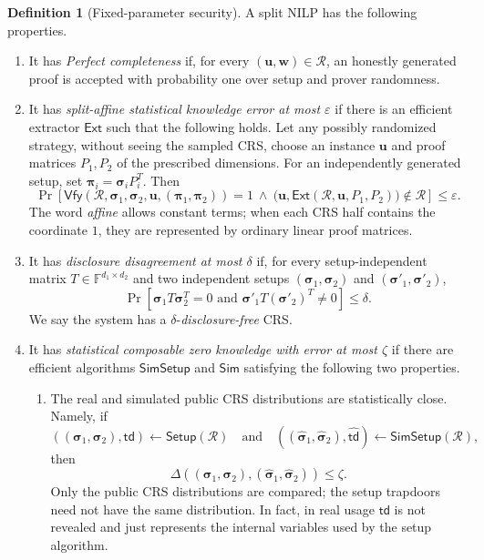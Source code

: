 \documentclass[11pt]{article}
\theoremstyle{definition}
\newtheorem{definition}[theorem]{Definition}
\newcommand{\F}{\mathbb F}
\newcommand{\cR}{\mathcal R}
\newcommand{\Setup}{\mathsf{Setup}}
\newcommand{\SimSetup}{\mathsf{SimSetup}}
\newcommand{\Vfy}{\mathsf{Vfy}}
\newcommand{\Sim}{\mathsf{Sim}}
\newcommand{\Ext}{\mathsf{Ext}}
\newcommand{\td}{\mathsf{td}}
\begin{document}
\begin{definition}[Fixed-parameter security]
\label{def:nilp-security}
A split NILP has the following properties.
\begin{enumerate}
  \item It has \emph{Perfect completeness} if, for every
  $(\mathbf u,\mathbf w)\in\cR$, an honestly generated proof is accepted with
  probability one over setup and prover randomness.

  \item It has \emph{split-affine statistical knowledge error at most
  $\varepsilon$} if there is an efficient extractor $\Ext$ such that the
  following holds.  Let any possibly randomized strategy, without seeing the
  sampled CRS, choose an instance $\mathbf u$ and proof matrices $P_1,P_2$ of
  the prescribed dimensions.  For an independently generated setup, set
  $\boldsymbol{\pi}_i=\boldsymbol{\sigma}_iP_i^T$.  Then
  \[
    \Pr\!\left[
      \Vfy(\cR,\boldsymbol{\sigma}_1,\boldsymbol{\sigma}_2,
           \mathbf u,(\boldsymbol{\pi}_1,\boldsymbol{\pi}_2))=1
      \ \land\
      \bigl(\mathbf u,\Ext(\cR,\mathbf u,P_1,P_2)\bigr)\notin\cR
    \right]
    \le\varepsilon.
  \]
  The word \emph{affine} allows constant terms; when each CRS half contains
  the coordinate $1$, they are represented by ordinary linear proof
  matrices.

  \item It has \emph{disclosure disagreement at most $\delta$} if, for every
  setup-independent matrix $T\in\F^{d_1\times d_2}$ and two independent
  setups $(\boldsymbol{\sigma}_1,\boldsymbol{\sigma}_2)$ and
  $(\boldsymbol{\sigma}'_1,\boldsymbol{\sigma}'_2)$,
  \[
    \Pr\!\left[
      \boldsymbol{\sigma}_1T\boldsymbol{\sigma}_2^T=0
      \text{ and }
      \boldsymbol{\sigma}'_1T(\boldsymbol{\sigma}'_2)^T\neq 0
    \right]
    \le\delta.
  \]
  We say the system has a $\delta$-\emph{disclosure-free} CRS.  

  \item It has \emph{statistical composable zero knowledge with error at most
  $\zeta$} if there are efficient algorithms $\SimSetup$ and $\Sim$ satisfying
  the following two properties.
  \begin{enumerate}[label=(\alph*)]
    \item The real and simulated public CRS distributions are statistically
    close.  Namely, if
    \[
      ((\boldsymbol{\sigma}_1,\boldsymbol{\sigma}_2),\td)
      \leftarrow\Setup(\cR)
      \quad\text{and}\quad
      ((\widehat{\boldsymbol{\sigma}}_1,
        \widehat{\boldsymbol{\sigma}}_2),\widehat{\td})
      \leftarrow\SimSetup(\cR),
    \]
    then
    \[
      \Delta\!\left(
        (\boldsymbol{\sigma}_1,\boldsymbol{\sigma}_2),
        (\widehat{\boldsymbol{\sigma}}_1,
         \widehat{\boldsymbol{\sigma}}_2)
      \right)\le\zeta.
    \]
    Only the public CRS distributions are compared; the setup trapdoors need
    not have the same distribution. In fact, in real usage $\td$ is not revealed and just represents the internal variables used by the setup algorithm.


\end{enumerate}
\end{enumerate}
\end{definition}
\end{document}
